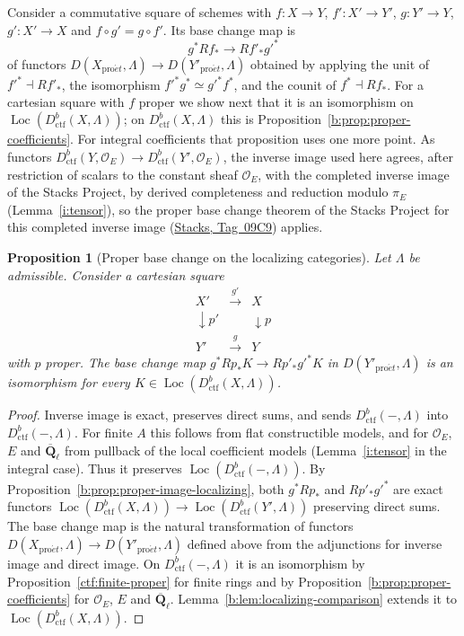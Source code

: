 \documentclass[11pt,a4paper]{article}
\numberwithin{equation}{section}
\newtheorem{proposition}[theorem]{Proposition}
\theoremstyle{definition}
\theoremstyle{remark}
\newcommand{\Loc}{\operatorname{Loc}}
\newcommand{\Qbar}{\overline{\mathbf Q}_\ell}
\newcommand{\proet}{\mathrm{pro}\acute{e}t}
\newcommand{\stacks}[1]{\href{https://stacks.math.columbia.edu/tag/#1}{\textnormal{Stacks, Tag~#1}}}
\newcommand{\Dctf}{D^b_{\mathrm{ctf}}}
\begin{document}
Consider a commutative square of schemes with $f\colon X\to Y$,
$f'\colon X'\to Y'$, $g\colon Y'\to Y$, $g'\colon X'\to X$ and
$f\circ g'=g\circ f'$. Its base change map is
\[
 g^*Rf_*\longrightarrow Rf'_*g'^*
\]
of functors $D(X_{\proet},\Lambda)\to D(Y'_{\proet},\Lambda)$ obtained by applying the unit of $f'^*\dashv Rf'_*$, the isomorphism
$f'^*g^*\simeq g'^*f^*$, and the counit of $f^*\dashv Rf_*$. For a cartesian square with $f$ proper we show next that it is an
isomorphism on $\Loc(\Dctf(X,\Lambda))$; on $\Dctf(X,\Lambda)$ this is
Proposition~\ref{b:prop:proper-coefficients}. For integral
coefficients that proposition uses one more point. As functors
$\Dctf(Y,\mathcal O_E)\to\Dctf(Y',\mathcal O_E)$, the
inverse image used here agrees, after restriction of scalars to the
constant sheaf $\mathcal O_E$, with the completed inverse image of the
Stacks Project, by derived completeness and reduction modulo $\pi_E$
(Lemma~\ref{i:tensor}), so the proper base change theorem of the Stacks
Project for this completed inverse image (\stacks{09C9}) applies.

\begin{proposition}[Proper base change on the localizing categories]
\label{b:prop:proper-base-change-unbounded}
Let $\Lambda$ be admissible. Consider a cartesian square
\[
\begin{array}{ccc}
X'&\xrightarrow{g'}&X\\
\downarrow p'&&\downarrow p\\
Y'&\xrightarrow{g}&Y
\end{array}
\]
with $p$ proper. The base change map $g^*Rp_*K\to Rp'_*g'^*K$ in
$D(Y'_{\proet},\Lambda)$ is an isomorphism for every
$K\in\Loc(\Dctf(X,\Lambda))$.
\end{proposition}

\begin{proof}
Inverse image is exact, preserves direct sums, and sends
$\Dctf(-,\Lambda)$ into $\Dctf(-,\Lambda)$. For finite $A$ this follows
from flat constructible models, and for $\mathcal O_E$, $E$ and $\Qbar$
from pullback of the local coefficient models
(Lemma~\ref{i:tensor} in the integral case). Thus it preserves
$\Loc(\Dctf(-,\Lambda))$. By
Proposition~\ref{b:prop:proper-image-localizing}, both $g^*Rp_*$ and
$Rp'_*g'^*$ are exact functors
$\Loc(\Dctf(X,\Lambda))\to\Loc(\Dctf(Y',\Lambda))$ preserving direct sums.
The base change map is the natural transformation of functors
$D(X_{\proet},\Lambda)\to D(Y'_{\proet},\Lambda)$ defined above from the
adjunctions for inverse image and direct image. On $\Dctf(-,\Lambda)$ it is an isomorphism
by Proposition~\ref{ctf:finite-proper} for finite rings and by
Proposition~\ref{b:prop:proper-coefficients} for $\mathcal O_E$, $E$ and $\Qbar$.
Lemma~\ref{b:lem:localizing-comparison} extends it to
$\Loc(\Dctf(X,\Lambda))$.
\end{proof}
\end{document}
